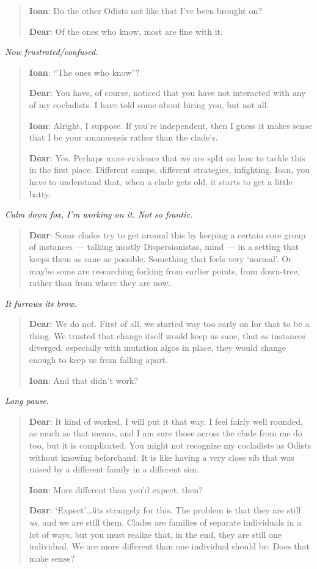 \begin{quote}
\textbf{Ioan}: Do the other Odists not like that I've been brought on?

\textbf{Dear}: Of the ones who know, most are fine with it.
\end{quote}

\emph{Now frustrated/confused.}

\begin{quote}
\textbf{Ioan}: ``The ones who know''?

\textbf{Dear}: You have, of course, noticed that you have not interacted with any of my cocladists. I have told some about hiring you, but not all.

\textbf{Ioan}: Alright, I suppose. If you're independent, then I guess it makes sense that I be your amanuensis rather than the clade's.

\textbf{Dear}: Yes. Perhaps more evidence that we are split on how to tackle this in the first place. Different camps, different strategies, infighting. Ioan, you have to understand that, when a clade gets old, it starts to get a little batty.
\end{quote}

\emph{Calm down fox, I'm working on it. Not so frantic.}

\begin{quote}
\textbf{Dear}: Some clades try to get around this by keeping a certain core group of instances — talking mostly Dispersionistas, mind — in a setting that keeps them as sane as possible. Something that feels very `normal'. Or maybe some are researching forking from earlier points, from down-tree, rather than from where they are now.
\end{quote}

\emph{It furrows its brow.}

\begin{quote}
\textbf{Dear}: We do not. First of all, we started way too early on for that to be a thing. We trusted that change itself would keep us sane, that as instances diverged, especially with mutation algos in place, they would change enough to keep us from falling apart.

\textbf{Ioan}: And that didn't work?
\end{quote}

\emph{Long pause.}

\begin{quote}
\textbf{Dear}: It kind of worked, I will put it that way. I feel fairly well rounded, as much as that means, and I am sure those across the clade from me do too, but it is complicated. You might not recognize my cocladists as Odists without knowing beforehand. It is like having a very close sib that was raised by a different family in a different sim.

\textbf{Ioan}: More different than you'd expect, then?

\textbf{Dear}: `Expect'\ldots{}fits strangely for this. The problem is that they are still \emph{us}, and we are still them. Clades are families of separate individuals in a lot of ways, but you must realize that, in the end, they are still one individual. We are more different than one individual should be. Does that make sense?
\end{quote}

